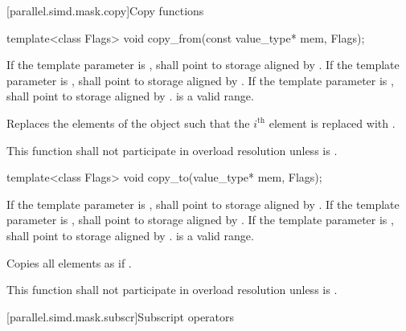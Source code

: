 [parallel.simd.mask.copy]{Copy functions}

\begin{itemdecl}
template<class Flags> void copy_from(const value_type* mem, Flags);
\end{itemdecl}

\begin{itemdescr}
  \pnum\requires
  If the template parameter  is ,  shall point to storage aligned by . If the template parameter  is ,  shall point to storage aligned by . If the template parameter  is ,  shall point to storage aligned by . \tcode{[mem, mem + size())} is a valid range.

  \pnum\effects
  Replaces the elements of the  object such that the $i^\text{th}$ element is replaced with  \foralli.

  \pnum\remarks
  This function shall not participate in overload resolution unless  is .

\end{itemdescr}

\begin{itemdecl}
template<class Flags> void copy_to(value_type* mem, Flags);
\end{itemdecl}

\begin{itemdescr}
  \pnum\requires
  If the template parameter  is ,  shall point to storage aligned by . If the template parameter  is ,  shall point to storage aligned by . If the template parameter  is ,  shall point to storage aligned by . \tcode{[mem, mem + size())} is a valid range.

  \pnum\effects
  Copies all  elements as if  \foralli.

  \pnum\remarks
  This function shall not participate in overload resolution unless  is .
\end{itemdescr}

[parallel.simd.mask.subscr]{Subscript operators}

